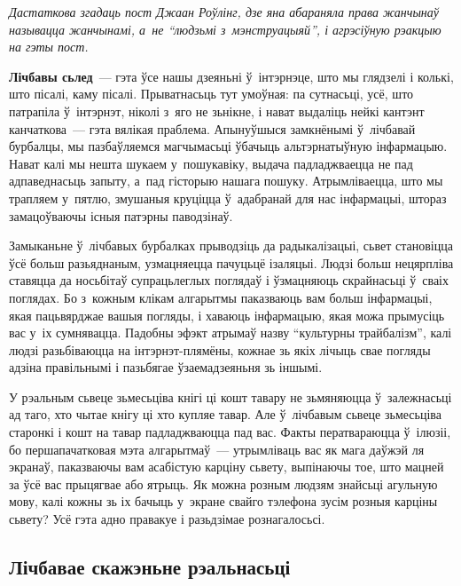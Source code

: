 \emph{Дастаткова згадаць пост Джаан Роўлінг, дзе яна абараняла права жанчынаў называцца жанчынамі, а~не ``людзьмі з~мэнструацыяй'', і агрэсіўную рэакцыю на гэты пост.}

\textbf{Лічбавы сьлед}~--- гэта ўсе нашы дзеяньні ў~інтэрнэце, што мы глядзелі і колькі, што пісалі, каму пісалі. Прыватнасьць тут умоўная: па сутнасьці, усё, што патрапіла ў~інтэрнэт, ніколі з~яго не зьнікне, і нават выдаліць нейкі кантэнт канчаткова~--- гэта вялікая праблема. Апынуўшыся замкнёнымі ў~лічбавай бурбалцы, мы пазбаўляемся магчымасьці ўбачыць альтэрнатыўную інфармацыю. Нават калі мы нешта шукаем у~пошукавіку, выдача падладжваецца не пад адпаведнасьць запыту, а~пад гісторыю нашага пошуку. Атрымліваецца, што мы трапляем у~пятлю, змушаныя круціцца ў~адабранай для нас інфармацыі, штораз замацоўваючы існыя патэрны паводзінаў. 


Замыканьне ў~лічбавых бурбалках прыводзіць да радыкалізацыі, сьвет становіцца ўсё больш разьяднаным, узмацняецца пачуцьцё ізаляцыі. Людзі больш нецярпліва ставяцца да носьбітаў супрацьлеглых поглядаў і ўзмацняюць скрайнасьці ў~сваіх поглядах. Бо з~кожным клікам алгарытмы паказваюць вам больш інфармацыі, якая пацьвярджае вашыя погляды, і хаваюць інфармацыю, якая можа прымусіць вас у~іх сумнявацца. Падобны эфэкт атрымаў назву ``культурны трайбалізм'', калі людзі разьбіваюцца на інтэрнэт-плямёны, кожнае зь якіх лічыць свае погляды адзіна правільнымі і пазьбягае ўзаемадзеяньня зь іншымі.

У рэальным сьвеце зьмесьціва кнігі ці кошт тавару не зьмяняюцца ў~залежнасьці ад таго, хто чытае кнігу ці хто купляе тавар. Але ў~лічбавым сьвеце зьмесьціва старонкі і кошт на тавар падладжваюцца пад вас. Факты ператвараюцца ў~ілюзіі, бо першапачатковая мэта алгарытмаў~--- утрымліваць вас як мага даўжэй ля экранаў, паказваючы вам асабістую карціну сьвету, выпінаючы тое, што мацней за ўсё вас прыцягвае або ятрыць. Як можна розным людзям знайсьці агульную мову, калі кожны зь іх бачыць у~экране свайго тэлефона зусім розныя карціны сьвету? Усё гэта адно правакуе і разьдзімае рознагалосьсі.

\subsection*{Лічбавае скажэньне рэальнасьці}

